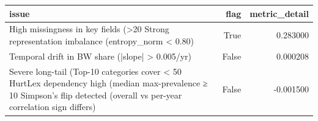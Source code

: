 \begin{tabular}{lrr}
\toprule
issue & flag & metric_detail \\
\midrule
High missingness in key fields (>20%
Strong representation imbalance (entropy_norm < 0.80) & True & 0.283000 \\
Temporal drift in BW share (|slope| > 0.005/yr) & False & 0.000208 \\
Severe long-tail (Top-10 categories cover < 50%
HurtLex dependency high (median max-prevalence ≥ 10%
Simpson’s flip detected (overall vs per-year correlation sign differs) & False & -0.001500 \\
\bottomrule
\end{tabular}
